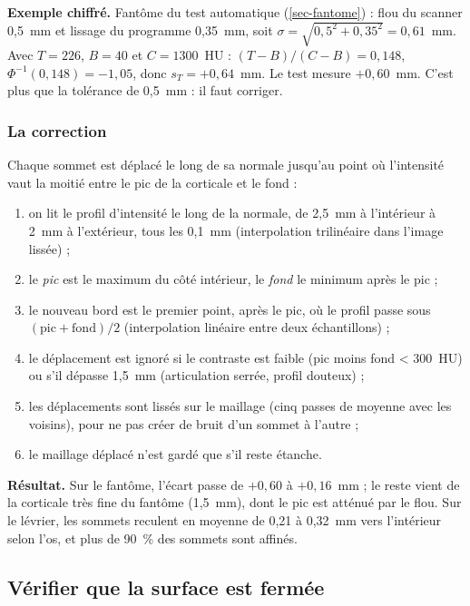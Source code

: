 \documentclass[11pt,a4paper]{article}
\begin{document}
\textbf{Exemple chiffré.} Fantôme du test automatique (\cref{sec-fantome}) : flou du scanner 0,5~mm et lissage du
programme 0,35~mm, soit $\sigma = \sqrt{0{,}5^2 + 0{,}35^2} = 0{,}61$~mm. Avec $T = 226$, $B = 40$ et $C = 1300$~HU :
$(T - B)/(C - B) = 0{,}148$, $\Phi^{-1}(0{,}148) = -1{,}05$, donc $s_T = +0{,}64$~mm. Le test mesure $+0{,}60$~mm.
C'est plus que la tolérance de 0,5~mm : il faut corriger.

\subsubsection{La correction}

Chaque sommet est déplacé le long de sa normale jusqu'au point où l'intensité vaut la moitié entre le pic de la
corticale et le fond :
\begin{enumerate}
  \item on lit le profil d'intensité le long de la normale, de 2,5~mm à l'intérieur à 2~mm à l'extérieur, tous les
  0,1~mm (interpolation trilinéaire dans l'image lissée) ;
  \item le \emph{pic} est le maximum du côté intérieur, le \emph{fond} le minimum après le pic ;
  \item le nouveau bord est le premier point, après le pic, où le profil passe sous $(\text{pic} + \text{fond})/2$
  (interpolation linéaire entre deux échantillons) ;
  \item le déplacement est ignoré si le contraste est faible (pic moins fond < 300~HU) ou s'il dépasse 1,5~mm
  (articulation serrée, profil douteux) ;
  \item les déplacements sont lissés sur le maillage (cinq passes de moyenne avec les voisins), pour ne pas créer de
  bruit d'un sommet à l'autre ;
  \item le maillage déplacé n'est gardé que s'il reste étanche.
\end{enumerate}

\textbf{Résultat.} Sur le fantôme, l'écart passe de $+0{,}60$ à $+0{,}16$~mm ; le reste vient de la corticale très
fine du fantôme (1,5~mm), dont le pic est atténué par le flou. Sur le lévrier, les sommets reculent en moyenne de 0,21
à 0,32~mm vers l'intérieur selon l'os, et plus de 90~\% des sommets sont affinés.

\subsection{Vérifier que la surface est fermée}
\label{sec-topologie}
\end{document}
